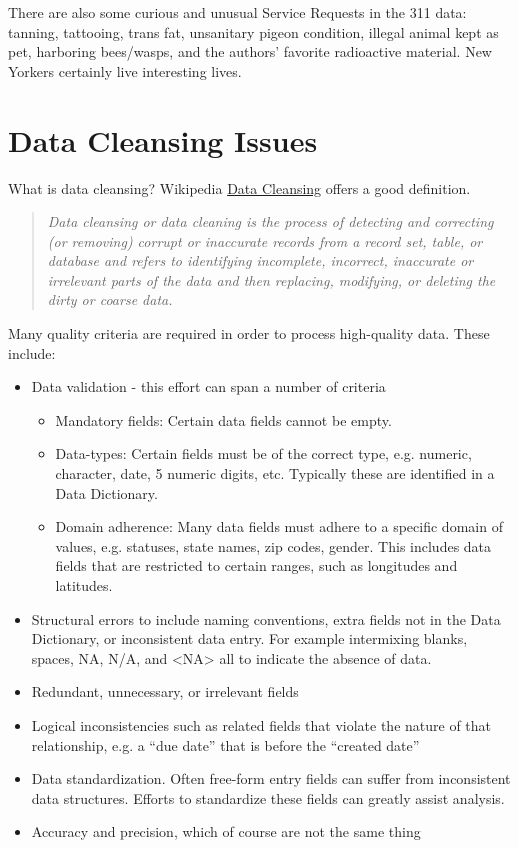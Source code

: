 \documentclass[12pt, titlepage]{article}
\begin{document}
There are also some curious and unusual Service Requests in the 311 data: 
tanning, tattooing, trans fat, unsanitary pigeon condition, illegal animal 
kept as pet, harboring bees/wasps, and the authors' favorite
radioactive material. New Yorkers certainly live interesting lives. 



\section{Data Cleansing Issues} \label{sec:issues}
What is data cleansing?  Wikipedia 
\href{https://en.wikipedia.org/wiki/Data_cleansing}{Data Cleansing} offers a good definition. 

\begin{quote}\textit{Data cleansing or data cleaning is the process of detecting and 
correcting (or removing) corrupt or inaccurate records from a record set, 
table, or database and refers to identifying incomplete, incorrect, 
inaccurate or irrelevant parts of the data and then replacing, 
modifying, or deleting the dirty or coarse data.}
\end{quote}

Many quality criteria are required in order to process high-quality 
data. These include:

\begin{itemize}
	\item Data validation - this effort can span a number of criteria
	\begin{itemize}
		\item Mandatory fields: Certain data fields cannot be empty.
		\item Data-types: Certain fields must be of the correct type, e.g. numeric, 
		character, date, 5 numeric digits, etc. Typically these are identified 
		in a Data Dictionary.
		\item Domain adherence:  Many data fields must adhere to a specific 
		domain of values, e.g. statuses, state names, zip codes, gender. 
		This includes data fields that are restricted to certain ranges, 
		such as longitudes and latitudes.
	\end{itemize}   
	\item Structural errors to include naming conventions, 
	extra fields not in the Data Dictionary, or inconsistent data entry.
	For example intermixing blanks, spaces, NA, N/A, and \textless{}NA\textgreater{} 
	all to indicate the absence of data.
	\item Redundant, unnecessary, or irrelevant fields
	\item Logical inconsistencies such as related fields that violate the 
	nature of that relationship, e.g. a ``due date'' that is before the ``created date''
	\item Data standardization. Often free-form entry fields can suffer 
	from inconsistent data structures. Efforts to standardize these fields 
	can greatly assist analysis.
	\item Accuracy and precision, which of course are not the same thing 
\end{itemize}
\end{document}
